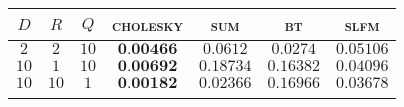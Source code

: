 
\begin{tabular}{|ccc|cccc|}
  \hline
  \abovespace\belowspace
  $D$ & $R$ & $Q$ & \textsc{cholesky} & \textsc{sum} & \textsc{bt} & \textsc{slfm}\\
\hline
  \abovespace
 $ 2 $ & $ 2 $ & $ 10 $ & $ \textbf{0.00466} $ & $ 0.0612 $ & $ 0.0274 $ & $ 0.05106 $ \\ 
 $ 10 $ & $ 1 $ & $ 10 $ & $ \textbf{0.00692} $ & $ 0.18734 $ & $ 0.16382 $ & $ 0.04096 $ \\ 
 $ 10 $ & $ 10 $ & $ 1 $ & $ \textbf{0.00182} $ & $ 0.02366 $ & $ 0.16966 $ & $ 0.03678 $ \\ 

  \belowspace \\

  \hline
\end{tabular}
